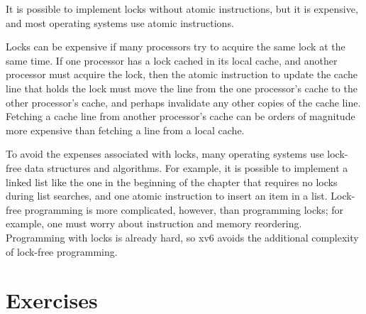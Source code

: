 It is possible to implement locks without atomic instructions, but it is
expensive, and most operating systems use atomic instructions.

Locks can be expensive if many processors try to acquire the same lock
at the same time.  If one processor has a lock
cached in its local cache, and another processor must acquire the lock, then the
atomic instruction to update the cache line that holds the lock must move the line
from the one processor's cache to the other processor's cache, and perhaps
invalidate any other copies of the cache line.  Fetching a cache line from
another processor's cache can be orders of magnitude more expensive than
fetching a line from a local cache.

To avoid the expenses associated with locks, many operating systems use
lock-free data structures and algorithms.  For example, it is possible to
implement a linked list like the one in the beginning of the chapter that
requires no locks during list searches, and one atomic instruction to insert an
item in a list.  Lock-free programming is more complicated, however, than
programming locks; for example, one must worry about instruction and memory
reordering.  Programming with locks is already hard, so xv6 avoids the
additional complexity of lock-free programming.

\section{Exercises}

